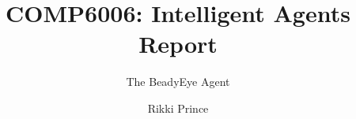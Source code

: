\documentclass{acm_proc_article-sp}
\begin{document}
\title{COMP6006: Intelligent Agents Report}
 \subtitle{The BeadyEye Agent
}
%
%
%
%
%

%
\author{
%
%
\alignauthor
Rikki Prince\\
       \\
       \\
       \\
}
\date{}
\end{document}
